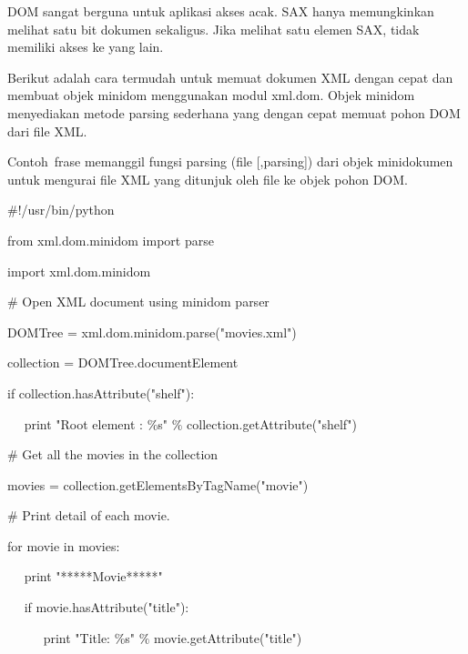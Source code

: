 \noindent 
 \hspace*{0.5in} DOM sangat berguna untuk aplikasi akses acak. SAX hanya memungkinkan melihat satu bit dokumen sekaligus. Jika melihat satu elemen SAX, tidak memiliki akses ke yang lain. \par
\noindent 
 \hspace*{0.5in} Berikut adalah cara termudah untuk memuat dokumen XML dengan cepat dan membuat objek minidom menggunakan modul xml.dom. Objek minidom menyediakan metode parsing sederhana yang dengan cepat memuat pohon DOM dari file XML. \par
\noindent 
 \hspace*{0.5in} Contoh~frase memanggil fungsi  parsing (file [,parsing]) dari objek minidokumen untuk mengurai file XML yang ditunjuk oleh file ke objek pohon DOM. \par
\noindent 
 $  \#  $!/usr/bin/python \par
\vspace{12pt}
\noindent 
from xml.dom.minidom import parse \par
\noindent 
import xml.dom.minidom \par
\vspace{12pt}
\noindent 
 $  \#  $ Open XML document using minidom parser \par
\noindent 
DOMTree = xml.dom.minidom.parse("movies.xml") \par
\noindent 
collection = DOMTree.documentElement \par
\noindent 
if collection.hasAttribute("shelf"): \par
\noindent 
~~ print "Root element :  $  \%  $s"  $  \%  $ collection.getAttribute("shelf") \par
\vspace{12pt}
\noindent 
 $  \#  $ Get all the movies in the collection \par
\noindent 
movies = collection.getElementsByTagName("movie") \par
\vspace{12pt}
\noindent 
 $  \#  $ Print detail of each movie. \par
\noindent 
for movie in movies: \par
\noindent 
~~ print "*****Movie*****" \par
\noindent 
~~ if movie.hasAttribute("title"): \par
\noindent 
~~~~~ print "Title:  $  \%  $s"  $  \%  $ movie.getAttribute("title") \par
\vspace{12pt}
